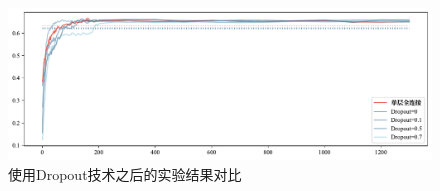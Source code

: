 \begin{figure}[htb]
	\centering
	\includegraphics[width=0.75\linewidth]{images/Dropout.pdf}
	\caption{使用Dropout技术之后的实验结果对比}
	\label{fig:Dropout2}
\end{figure}